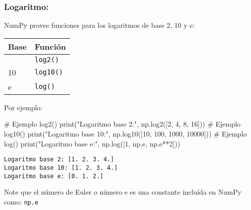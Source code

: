 \documentclass[
  letterpaper,
  DIV=11,
  numbers=noendperiod]{scrreprt}
\newenvironment{Shaded}{\begin{snugshade}}{\end{snugshade}}
\newcommand{\BuiltInTok}[1]{\textcolor[rgb]{0.00,0.23,0.31}{#1}}
\newcommand{\CommentTok}[1]{\textcolor[rgb]{0.37,0.37,0.37}{#1}}
\newcommand{\DecValTok}[1]{\textcolor[rgb]{0.68,0.00,0.00}{#1}}
\newcommand{\NormalTok}[1]{\textcolor[rgb]{0.00,0.23,0.31}{#1}}
\newcommand{\OperatorTok}[1]{\textcolor[rgb]{0.37,0.37,0.37}{#1}}
\newcommand{\StringTok}[1]{\textcolor[rgb]{0.13,0.47,0.30}{#1}}
\begin{document}
\subsubsection{Logaritmo:}\label{logaritmo}

NumPy provee funciones para los logaritmos de base 2, 10 y e:

\begin{longtable}[]{@{}ll@{}}
\toprule\noalign{}
Base & Función \\
\midrule\noalign{}
\endhead
\bottomrule\noalign{}
\endlastfoot
2 & \texttt{log2()} \\
10 & \texttt{log10()} \\
e & \texttt{log()} \\
\end{longtable}

Por ejemplo:

\begin{Shaded}
\begin{Highlighting}[]
\CommentTok{\# Ejemplo log2()}
\BuiltInTok{print}\NormalTok{(}\StringTok{"Logaritmo base 2:"}\NormalTok{, np.log2([}\DecValTok{2}\NormalTok{, }\DecValTok{4}\NormalTok{, }\DecValTok{8}\NormalTok{, }\DecValTok{16}\NormalTok{]))}
\CommentTok{\# Ejemplo log10()}
\BuiltInTok{print}\NormalTok{(}\StringTok{"Logaritmo base 10:"}\NormalTok{, np.log10([}\DecValTok{10}\NormalTok{, }\DecValTok{100}\NormalTok{, }\DecValTok{1000}\NormalTok{, }\DecValTok{10000}\NormalTok{]))}
\CommentTok{\# Ejemplo log()}
\BuiltInTok{print}\NormalTok{(}\StringTok{"Logaritmo base e:"}\NormalTok{, np.log([}\DecValTok{1}\NormalTok{, np.e, np.e}\OperatorTok{**}\DecValTok{2}\NormalTok{]))}
\end{Highlighting}
\end{Shaded}

\begin{verbatim}
Logaritmo base 2: [1. 2. 3. 4.]
Logaritmo base 10: [1. 2. 3. 4.]
Logaritmo base e: [0. 1. 2.]
\end{verbatim}

\begin{tcolorbox}[enhanced jigsaw, opacityback=0, coltitle=black, toptitle=1mm, colframe=quarto-callout-note-color-frame, leftrule=.75mm, colback=white, opacitybacktitle=0.6, toprule=.15mm, breakable, bottomrule=.15mm, rightrule=.15mm, bottomtitle=1mm, titlerule=0mm, title=\textcolor{quarto-callout-note-color}{\faInfo}\hspace{0.5em}{Note}, colbacktitle=quarto-callout-note-color!10!white, left=2mm, arc=.35mm]

Note que el número de Euler o número e es una constante incluída en
NumPy como: \texttt{np.e}

\end{tcolorbox}
\end{document}
